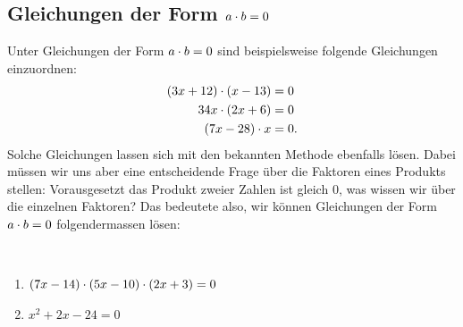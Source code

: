 \documentclass[11pt,oneside]{article}
\begin{document}
\subsection{Gleichungen der Form \(a\cdot b=0\)}
	Unter \flqq Gleichungen der Form $a\cdot b=0$\frqq\: sind beispielsweise folgende Gleichungen einzuordnen:
	\begin{align*}
		(3x+12)\cdot(x-13) &= 0\\
		34x\cdot(2x+6) &= 0\\
		(7x-28)\cdot x &= 0.
	\end{align*}
	Solche Gleichungen lassen sich mit den bekannten Methode ebenfalls lösen. Dabei müssen wir uns aber eine entscheidende Frage über die Faktoren eines Produkts stellen:\newline
	\flqq Vorausgesetzt das Produkt zweier Zahlen ist gleich $0$, was wissen wir über die einzelnen Faktoren?\frqq\vspace{5pt}\newline{}
	Das bedeutete also, wir können Gleichungen der Form $a\cdot b=0$ folgendermassen lösen:
	\begin{beispiel} \
		\begin{enumerate}
			\item $(7x-14)\cdot(5x-10)\cdot(2x+3)=0$
		\end{enumerate}
		\begin{enumerate}
			\setcounter{enumi}{1}
			\item $x^2+2x-24=0$
		\end{enumerate}
	\end{beispiel}
\end{document}
